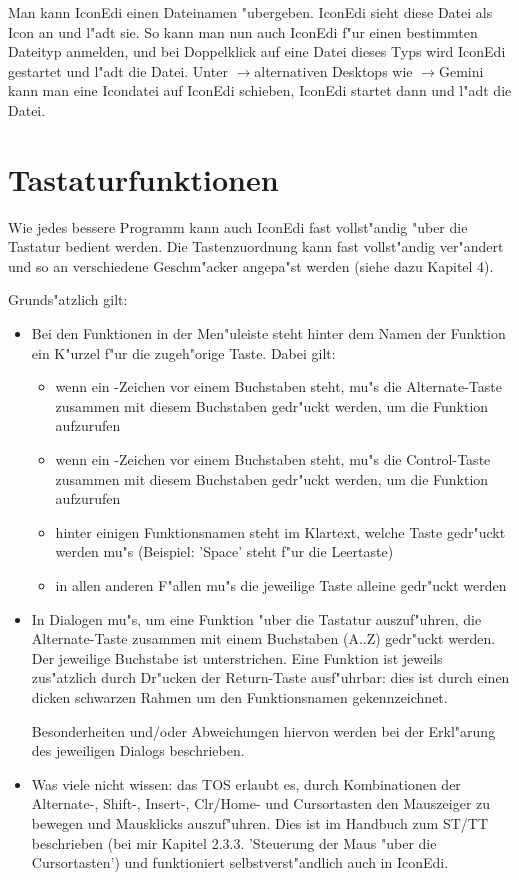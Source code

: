 Man kann IconEdi einen Dateinamen "ubergeben. IconEdi sieht diese Datei
als Icon an und l"adt sie. So kann man nun auch IconEdi f"ur einen 
bestimmten Dateityp anmelden, und bei Doppelklick auf eine
Datei dieses Typs wird IconEdi gestartet und l"adt die Datei. Unter 
$\to$alternativen Desktops wie $\to$Gemini  
kann man eine Icondatei auf IconEdi schieben, IconEdi startet dann
und l"adt die Datei.

\section{Tastaturfunktionen} 
Wie jedes bessere Programm kann auch IconEdi fast vollst"andig "uber
die Tastatur bedient werden. Die Tastenzuordnung kann fast 
vollst"andig ver"andert und so an verschiedene Geschm"acker angepa"st 
werden (siehe dazu Kapitel 4). 

Grunds"atzlich gilt: 

\begin{itemize}

 \item Bei den Funktionen in der Men"uleiste steht hinter
 dem Namen der Funktion ein K"urzel f"ur die zugeh"orige Taste. 
 Dabei gilt: 
  \begin{itemize}
   \item wenn ein \alternate -Zeichen vor einem Buchstaben 
   steht, mu"s die Alternate-Taste zusammen mit diesem Buchstaben
   gedr"uckt werden, um die Funktion aufzurufen
   \item wenn ein \control -Zeichen vor einem Buchstaben
   steht, mu"s die Control-Taste zusammen mit diesem Buchstaben
   gedr"uckt werden, um die Funktion aufzurufen
   \item hinter einigen Funktionsnamen steht im Klartext, welche 
   Taste gedr"uckt werden mu"s (Beispiel: 'Space' steht f"ur die 
   Leertaste)
   \item in allen anderen F"allen mu"s die jeweilige Taste alleine 
   gedr"uckt werden
  \end{itemize}

 \item In Dialogen mu"s, um eine Funktion "uber die Tastatur 
 auszuf"uhren, die Alternate-Taste zusammen mit einem Buchstaben 
 (A..Z) gedr"uckt werden. Der jeweilige Buchstabe ist unterstrichen. 
 Eine Funktion ist jeweils zus"atzlich durch Dr"ucken der Return-Taste 
 ausf"uhrbar: dies ist durch einen dicken schwarzen Rahmen um den 
 Funktionsnamen gekennzeichnet.

 Besonderheiten und/oder Abweichungen hiervon werden bei der 
 Erkl"arung des jeweiligen Dialogs beschrieben.

 \item Was viele nicht wissen: das TOS erlaubt es, durch 
 Kombinationen der Alternate-, Shift-, Insert-, Clr/Home- und 
 Cursortasten den Mauszeiger zu bewegen und Mausklicks 
 auszuf"uhren. Dies ist im Handbuch zum ST/TT beschrieben (bei 
 mir Kapitel 2.3.3. 'Steuerung der Maus "uber die Cursortasten')
 und funktioniert selbstverst"andlich auch in IconEdi.

\end{itemize}

